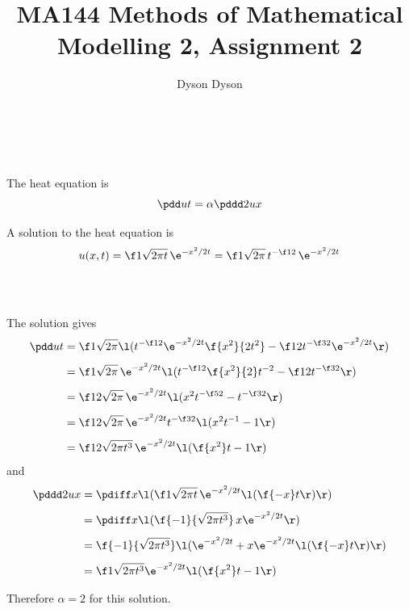 \documentclass[a4paper]{article}
\title{MA144 Methods of Mathematical Modelling 2, Assignment 2}
\author{Dyson Dyson}
\date{}
\begin{document}
\maketitle

\setlength{\parindent}{0em}
\setlength{\parskip}{1em}


\subsection{~}

The heat equation is
$$\pdd ut = \alpha \pddd 2ux$$

A solution to the heat equation is
$$u(x, t) = \f1{\sqrt{2 \pi t}}\, \e^{- x^2 / 2t} = \f1{\sqrt{2\pi}}\, t^{-\f12}\, \e^{- x^2 / 2t}$$

\subsubsection{~}

The solution gives \begin{align*}
\pdd ut &= \f1{\sqrt{2\pi}} \l( t^{-\f12} \e^{-x^2 / 2t} \f{x^2}{2t^2} - \f12 t^{-\f32} \e^{-x^2 / 2t} \r)\\[1ex]
&= \f1{\sqrt{2\pi}}\, \e^{-x^2 / 2t} \l( t^{-\f12} \f{x^2}{2} t^{-2} - \f12 t^{-\f32} \r)\\[1ex]
&= \f1{2\sqrt{2\pi}}\, \e^{-x^2 / 2t} \l( x^2 t^{-\f52} - t^{-\f32} \r)\\[1ex]
&= \f1{2\sqrt{2\pi}}\, \e^{-x^2 / 2t} t^{-\f32} \l( x^2 t^{-1} - 1 \r)\\[1ex]
&= \f1{2\sqrt{2\pi t^3}}\, \e^{-x^2 / 2t} \l( \f{x^2}t - 1 \r)
\end{align*}
and \begin{align*}
\pddd 2ux &= \pdiff x \l( \f1{\sqrt{2\pi t}}\, \e^{-x^2 / 2t} \l( \f{-x}t \r) \r)\\[1ex]
&= \pdiff x \l( \f{-1}{\sqrt{2\pi t^3}}\, x \e^{-x^2 / 2t} \r)\\[1ex]
&= \f{-1}{\sqrt{2\pi t^3}} \l( \e^{-x^2 / 2t} + x \e^{-x^2 / 2t} \l(\f{-x}t\r) \r)\\[1ex]
&= \f1{\sqrt{2\pi t^3}} \e^{-x^2 / 2t} \l( \f{x^2}t - 1 \r)
\end{align*}

Therefore $\alpha = 2$ for this solution.

\subsubsection{~}
\end{document}
